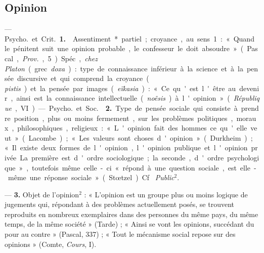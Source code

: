 \subsection{Opinion}
 — \si{Psycho.} et \si{Crit.} {\bf 1.} 
Assentiment* partiel ; croyance, au sens 1 : « Quand le pénitent suit une
opinion probable, le confesseur le doit absoudre » (Pascal, {\it Prov.}, 5).
Spéc., {\it chez Platon} (grec {\it doxa}) : type de connaissance inférieur à
la science et à la pensée discursive et qui comprend la croyance ({\it
pistis}) et la pensée par images ({\it eïkasia}) : « Ce qu'est l'être au
devenir, ainsi est la connaissance intellectuelle ({\it noêsis}) à l'opinion
» ({\it République}, VI).

 — \si{Psycho.} et \si{Soc.}  {\bf 2.} Type de
pensée sociale qui consiste à prendre position, plus ou moins fermement, sur
les problèmes politiques, moraux, philosophiques, religieux : « L'opinion
fait des hommes ce qu'elle veut » (Lacombe) ; « Les valeurs sont choses
d'opinion » (Durkheim) ; « Il existe deux formes de l'opinion, l'opinion
publique et l'opinion privée. La première est d'ordre sociologique ; ... la
seconde, d'ordre psychologique », toutefois même celle-ci « répond à une
question sociale, est elle-même une réponse sociale » (Stœtzel). Cf. {\it
Public}$^2$.

 —  {\bf 3.} Objet de l'opinion$^2$ : « L'opinion
est un groupe plus ou moins logique de jugements qui, répondant à des
problèmes actuellement posés, se trouvent reproduits en nombreux exemplaires
dans des personnes du même pays, du même temps, de la même société
» (Tarde) ; « Ainsi se vont les opinions, succédant du pour au contre
» (Pascal, 337) ; « Tout le mécanisme social repose sur des opinions
» (Comte, {\it Cours}, I).

